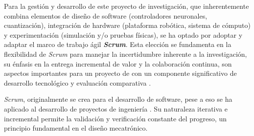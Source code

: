 \documentclass[12pt]{article}
\begin{document}
Para la gestión y desarrollo de este proyecto de investigación, que inherentemente combina elementos de diseño de software (controladores neuronales, cuantización), integración de hardware (plataforma robótica, sistema de cómputo) y experimentación (simulación y/o pruebas físicas), se ha optado por adoptar y adaptar el marco de trabajo ágil \textbf{\textit{Scrum}}. Esta elección se fundamenta en la flexibilidad de \textit{Scrum} para manejar la incertidumbre inherente a la investigación, su énfasis en la entrega incremental de valor y la colaboración continua, son aspectos importantes para un proyecto de con un componente significativo de desarrollo tecnológico y evaluación comparativa \cite{Schwaber2020ScrumGuide}.

\textit{Scrum}, originalmente se crea para el desarrollo de software, pese a eso se ha aplicado al desarrollo de proyectos de ingeniería \cite{cano2021scrum}. Su naturaleza iterativa e incremental permite la validación y verificación constante del progreso, un principio fundamental en el diseño mecatrónico.
\end{document}

